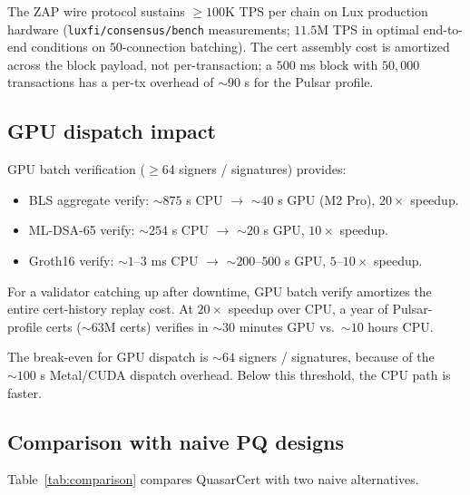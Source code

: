 The ZAP wire protocol \cite{lp020} sustains $\geq 100$K TPS per
chain on Lux production hardware (\texttt{luxfi/consensus/bench}
measurements; $11.5$M TPS in optimal end-to-end conditions on
$50$-connection batching). The cert assembly cost is amortized
across the block payload, not per-transaction; a $500$ ms block
with $50{,}000$ transactions has a per-tx overhead of
$\sim 90$ \textmu s for the Pulsar profile.

\subsection{GPU dispatch impact}

GPU batch verification ($\geq 64$ signers / signatures) provides:

\begin{itemize}[leftmargin=2em,nosep]
\item BLS aggregate verify: $\sim 875$ \textmu s CPU
      $\rightarrow$ $\sim 40$ \textmu s GPU (M2 Pro), $20\times$ speedup.
\item ML-DSA-65 verify: $\sim 254$ \textmu s CPU
      $\rightarrow$ $\sim 20$ \textmu s GPU, $10\times$ speedup.
\item Groth16 verify: $\sim 1$--$3$ ms CPU
      $\rightarrow$ $\sim 200$--$500$ \textmu s GPU, $5$--$10\times$ speedup.
\end{itemize}

For a validator catching up after downtime, GPU batch verify
amortizes the entire cert-history replay cost. At $20\times$
speedup over CPU, a year of Pulsar-profile certs ($\sim 63$M
certs) verifies in $\sim 30$ minutes GPU vs.~$\sim 10$ hours CPU.

The break-even for GPU dispatch is $\sim 64$ signers / signatures,
because of the $\sim 100$ \textmu s Metal/CUDA dispatch overhead.
Below this threshold, the CPU path is faster.

\subsection{Comparison with naive PQ designs}

Table~\ref{tab:comparison} compares QuasarCert with two naive
alternatives.

